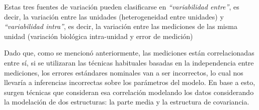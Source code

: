 \documentclass[spanish]{article}
\numberwithin{figure}{subsection}
\numberwithin{equation}{subsection}
\numberwithin{table}{subsection}
\begin{document}
Estas tres fuentes de variación pueden clasificarse en \textit{``variabilidad
entre''}, es decir, la variación entre las unidades (heterogeneidad entre
unidades) y \textit{``variabilidad intra''}, es decir, la variación entre las
mediciones de las misma unidad (variación biológica intra-unidad y error de
medición)

Dado que, como se mencionó anteriormente, las mediciones están correlacionadas
entre sí, si se utilizaran las técnicas habituales basadas en la independencia
entre mediciones, los errores estándares nominales van a ser incorrectos, lo
cual nos llevaría a inferencias incorrectas sobre los parámetros del modelo. En
base a esto, surgen técnicas que consideran esa correlación modelando los datos
considerando la modelación de dos estructuras: la parte media y la estructura
de covariancia.





\end{document}
